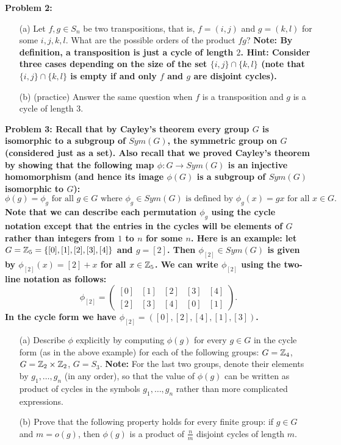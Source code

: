 \documentclass[11pt]{amsart}
\begin{document}
\bf{Problem 2: }\rm 
\begin{itemize}
\item[(a)] Let $f,g\in S_n$ be two transpositions,
that is, $f=(i,j)$ and $g=(k,l)$ for some $i,j,k,l$.
What are the possible orders of the product $fg$?
\bf{Note: }\rm By definition, a transposition is just a cycle of length $2$.
\bf{Hint: }\rm Consider three cases depending on
the size of the set $\{i,j\}\cap \{k,l\}$
(note that $\{i,j\}\cap \{k,l\}$ is empty if and only $f$ and $g$
are disjoint cycles).

\item[(b)] (practice) Answer the same question when $f$ is a transposition
and $g$ is a cycle of length $3$.
\end{itemize}
\skv


\skv
\bf{Problem 3: }\rm Recall that by Cayley's theorem every group $G$ is isomorphic to a subgroup of $Sym(G)$, the symmetric
group on $G$ (considered just as a set). Also recall that we proved Cayley's theorem by showing that the following map
$\phi:G\to Sym(G)$ is an injective homomorphism (and hence its image $\phi(G)$ is a subgroup of $Sym(G)$ isomorphic to $G$):
$$\phi(g)=\phi_g\mbox{ for all }g\in G \mbox{ where }\phi_g\in Sym(G)\mbox{ is defined by }\phi_g(x)=gx\mbox{ for all }x\in G.$$
Note that we can describe each permutation $\phi_g$ using the cycle notation except that the entries in the cycles will be
elements of $G$ rather than integers from $1$ to $n$ for some $n$. Here is an example:
let $G={\mathbb Z}_5=\{[0],[1],[2],[3],[4]\}$ and $g=[2]$. Then $\phi_{[2]}\in Sym(G)$ is given by $\phi_{[2]}(x)=[2]+x$ for all $x\in {\mathbb Z}_5$.
We can write $\phi_{[2]}$ using the two-line notation as follows: 
$$\phi_{[2]}=\begin{pmatrix} [0] & [1] & [2] & [3] & [4]\\ [2] & [3] & [4] & [0] & [1] 
\end{pmatrix}.$$ 
In the cycle form we have $\phi_{[2]}=([0],[2],[4],[1],[3])$.

\begin{itemize}
\item[(a)] Describe $\phi$ explicitly by computing $\phi(g)$ for every $g\in G$ in the cycle form (as in the above example) for each of the following groups:
$G={\mathbb Z}_4$,  $G={\mathbb Z}_2\times {\mathbb Z}_2$, $G=S_3$. {\bf Note:} For the last two groups, denote their elements by $g_1,\ldots, g_n$
(in any order), so that the value of $\phi(g)$ can be written as product of cycles in the symbols $g_1,\ldots, g_n$ rather than more complicated expressions.
\item[(b)] Prove that the following property holds for every finite group: if $g\in G$ and $m=o(g)$, then
$\phi(g)$ is a product of $\frac{n}{m}$ disjoint cycles of length $m$.
\end{itemize}
\end{document}
